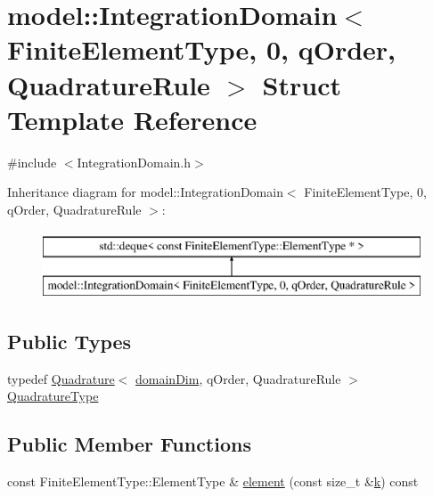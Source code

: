 \hypertarget{structmodel_1_1_integration_domain_3_01_finite_element_type_00_010_00_01q_order_00_01_quadrature_rule_01_4}{}\section{model\+:\+:Integration\+Domain$<$ Finite\+Element\+Type, 0, q\+Order, Quadrature\+Rule $>$ Struct Template Reference}
\label{structmodel_1_1_integration_domain_3_01_finite_element_type_00_010_00_01q_order_00_01_quadrature_rule_01_4}


{\ttfamily \#include $<$Integration\+Domain.\+h$>$}

Inheritance diagram for model\+:\+:Integration\+Domain$<$ Finite\+Element\+Type, 0, q\+Order, Quadrature\+Rule $>$\+:\begin{figure}[H]
\begin{center}
\leavevmode
\includegraphics[height=2.000000cm]{structmodel_1_1_integration_domain_3_01_finite_element_type_00_010_00_01q_order_00_01_quadrature_rule_01_4}
\end{center}
\end{figure}
\subsection*{Public Types}
\begin{DoxyCompactItemize}
\item 
typedef \hyperlink{structmodel_1_1_quadrature}{Quadrature}$<$ \hyperlink{structmodel_1_1_integration_domain_3_01_finite_element_type_00_010_00_01q_order_00_01_quadrature_rule_01_4_a6e663723cfa6cd7cff426573312390b3}{domain\+Dim}, q\+Order, Quadrature\+Rule $>$ \hyperlink{structmodel_1_1_integration_domain_3_01_finite_element_type_00_010_00_01q_order_00_01_quadrature_rule_01_4_a5e4db1863b830931b70c2862b829189f}{Quadrature\+Type}
\end{DoxyCompactItemize}
\subsection*{Public Member Functions}
\begin{DoxyCompactItemize}
\item 
const Finite\+Element\+Type\+::\+Element\+Type \& \hyperlink{structmodel_1_1_integration_domain_3_01_finite_element_type_00_010_00_01q_order_00_01_quadrature_rule_01_4_a86bc59619a58cd995c43143e813f89d2}{element} (const size\+\_\+t \&\hyperlink{_f_e_m_2linear__elasticity__3d_2tetgen_2generate_p_o_l_ycube_8m_a5d2aad4440da75aa43f2643e72b1a3bd}{k}) const 
\end{DoxyCompactItemize}
